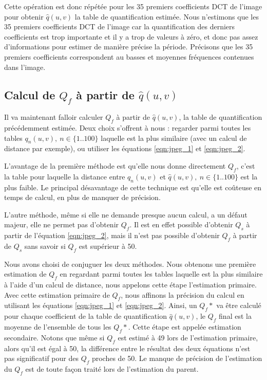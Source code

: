 \documentclass[utf8,final]{stageM2R} %
\begin{document}
Cette opération est donc répétée pour les 35 premiers coefficients DCT de l'image pour obtenir $\widehat{q}(u,v)$ la table de quantification estimée. Nous n'estimons que les 35 premiers coefficients DCT de l'image car la quantification des derniers coefficients est trop importante et il y a trop de valeurs à zéro, et donc pas assez d'informations pour estimer de manière précise la période. Précisons que les 35 premiers coefficients correspondent au basses et moyennes fréquences contenues dans l'image.

\subsection{Calcul de $Q_f$ à partir de $\widehat{q}(u,v)$}
\label{sec:estimation}
Il va maintenant falloir calculer $Q_f$ à partir de $\widehat{q}(u,v)$, la table de quantification précédemment estimée. Deux choix s'offrent à nous : regarder parmi toutes les tables $q_n(u,v),\ n\in\{1..100\}$ laquelle est la plus similaire (avec un calcul de distance par exemple), ou utiliser les équations \ref{eqn:jpeg_1} et \ref{eqn:jpeg_2}. 

L'avantage de la première méthode est qu'elle nous donne directement $Q_f$, c'est la table pour laquelle la distance entre $q_n(u,v)$ et $\widehat{q}(u,v),\ n\in \{1..100\}$ est la plus faible. Le principal désavantage de cette technique est qu'elle est coûteuse en temps de calcul, en plus de manquer de précision.

L'autre méthode, même si elle ne demande presque aucun calcul, a un défaut majeur, elle ne permet pas d'obtenir $Q_f$. Il est en effet possible d'obtenir $Q_s$ à partir de l'équation \ref{eqn:jpeg_2}, mais il n'est pas possible d'obtenir $Q_f$ à partir de $Q_s$ sans savoir si $Q_f$ est supérieur à 50.

Nous avons choisi de conjuguer les deux méthodes. Nous obtenons une première estimation de $Q_f$ en regardant parmi toutes les tables laquelle est la plus similaire à l'aide d'un calcul de distance, nous appelons cette étape l'estimation primaire. Avec cette estimation primaire de $Q_f$, nous affinons la précision du calcul en utilisant les équations \ref{eqn:jpeg_1} et \ref{eqn:jpeg_2}. Ainsi, un $Q_f*$ va être calculé pour chaque coefficient de la table de quantification $\widehat{q}(u,v)$, le $Q_f$ final est la moyenne de l'ensemble de tous les $Q_f*$. Cette étape est appelée estimation secondaire. Notons que même si $Q_f$ est estimé à 49 lors de l'estimation primaire, alors qu'il est égal à 50, la différence entre le résultat des deux équations n'est pas significatif pour des $Q_f$ proches de 50. Le manque de précision de l'estimation du $Q_f$ est de toute façon traité lors de l'estimation du parent.
\end{document}
